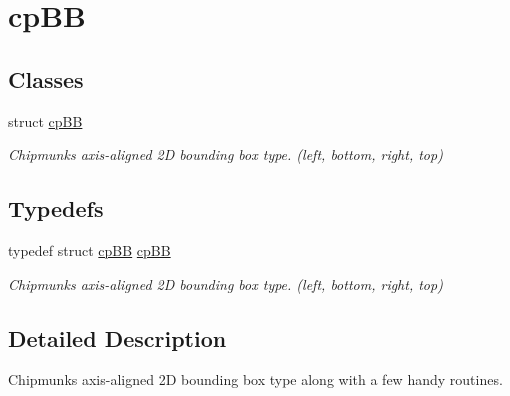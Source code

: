 \hypertarget{group__cp_b_b_b}{}\section{cp\+BB}
\label{group__cp_b_b_b}
\subsection*{Classes}
\begin{DoxyCompactItemize}
\item 
struct \mbox{\hyperlink{structcp_b_b}{cp\+BB}}
\begin{DoxyCompactList}\small\item\em Chipmunk\textquotesingle{}s axis-\/aligned 2D bounding box type. (left, bottom, right, top) \end{DoxyCompactList}\end{DoxyCompactItemize}
\subsection*{Typedefs}
\begin{DoxyCompactItemize}
\item 
\mbox{\label{group__cp_b_b_b_ga94835b3c44de11eae51d596f39a5fabc}} 
typedef struct \mbox{\hyperlink{structcp_b_b}{cp\+BB}} \mbox{\hyperlink{group__cp_b_b_b_ga94835b3c44de11eae51d596f39a5fabc}{cp\+BB}}
\begin{DoxyCompactList}\small\item\em Chipmunk\textquotesingle{}s axis-\/aligned 2D bounding box type. (left, bottom, right, top) \end{DoxyCompactList}\end{DoxyCompactItemize}


\subsection{Detailed Description}
Chipmunk\textquotesingle{}s axis-\/aligned 2D bounding box type along with a few handy routines. 
